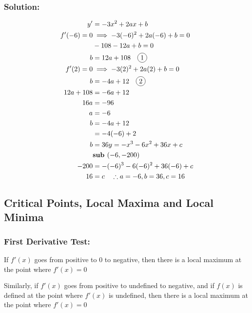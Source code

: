 \documentclass{article}
\newcommand*\circled[1]{\tikz[baseline=(char.base)]{
            \node[shape=circle,draw,inner sep=2pt] (char) {#1};}}
\begin{document}
\subsubsection*{Solution:}
\begin{align*}
    y'&=-3x^2+2ax+b\\
    f'(-6)=0 &\implies -3(-6)^2+2a(-6)+b=0\\
    &-108-12a+b=0\\
    b&=12a+108 \quad \circled{1}\\
    f'(2)=0 &\implies -3(2)^2+2a(2)+b=0\\
    b&=-4a+12 \quad \circled{2}\\
    12a+108&=-6a+12\\
    16a&=-96\\
    a&=-6\\
    b&=-4a+12\\
    &=-4(-6)+2\\
    b&=36
    y=-x^3-6x^2+36x+c\\
    &\textbf{sub } (-6,-200)\\
    -200&=-(-6)^3-6(-6)^2+36(-6)+c\\
    16&=c \quad \therefore a=-6, b=36, c=16
\end{align*}
\subsection{Critical Points, Local Maxima and Local Minima}
\subsubsection{First Derivative Test:}
If $f'(x)$ goes from positive to 0 to negative, then there is a local maximum at the point where $f'(x)=0$
\begin{center}
\end{center}

Similarly, if $f'(x)$ goes from positive to undefined to negative, and if $f(x)$ is defined at the point where $f'(x)$ is undefined, then there is a local maximum at the point where $f'(x)=0$
\end{document}
